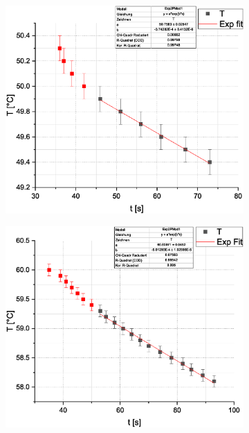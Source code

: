 \documentclass[10pt,a4paper]{article}
\begin{document}
\begin{figure}[H]
\begin{subfigure}[c]{.5\textwidth}
\centering
\includegraphics[scale=0.3]{Reihe3}
\label{fig:r3}
\end{subfigure}%
%
\begin{subfigure}[c]{.5\textwidth}
\centering
\includegraphics[scale=0.3]{Reihe4}
\label{fig:r4}
\end{subfigure}%


\end{figure}
\end{document}
